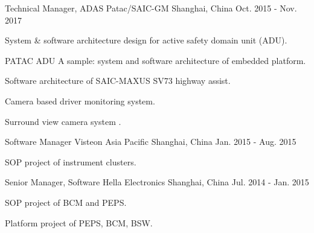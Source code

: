 \documentclass[../cv.tex]{subfiles}
\begin{document}
\begin{cventries}
	\cventry
	{Technical Manager, ADAS} %
	{Patac/SAIC-GM} %
	{Shanghai, China} %
	{Oct. 2015 - Nov. 2017} %
	{
		\begin{cvitems}
			\item System \& software architecture design for active safety domain unit (ADU).
			\item PATAC ADU A sample: system and software architecture of embedded platform.
			\item Software architecture of SAIC-MAXUS SV73 highway assist.
			\item Camera based driver monitoring system.
			\item Surround view camera system \supercite{Xin_RearView_17}.
		\end{cvitems}
	}


	\cventry
	{Software Manager} %
	{Visteon Asia Pacific} %
	{Shanghai, China} %
	{Jan. 2015 - Aug. 2015} %
	{
		\begin{cvitems}
			\item SOP project of instrument clusters.
		\end{cvitems}
	}

	\cventry
	{Senior Manager, Software} %
	{Hella Electronics} %
	{Shanghai, China} %
	{Jul. 2014 - Jan. 2015} %
	{
		\begin{cvitems}
			\item SOP project of BCM and PEPS.
			\item Platform project of PEPS, BCM, BSW.
		\end{cvitems}
	}


\end{cventries}
\end{document}
